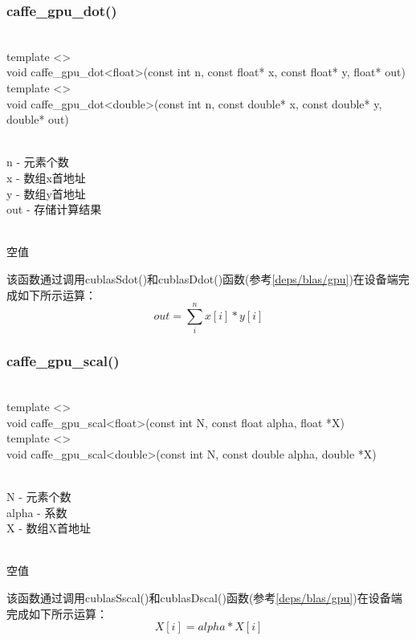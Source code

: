 \subsubsection{caffe\_gpu\_dot()}
\begin{cnfrmfunc}
   \item{}\\
     template <>\\
     void caffe\_gpu\_dot<float>(const int n, const float* x, const float* y, float* out)\\

     template <>\\
     void caffe\_gpu\_dot<double>(const int n, const double* x, const double* y, double* out) 
   \item{}\\
     n - 元素个数\\
     x - 数组x首地址\\
     y - 数组y首地址\\
     out - 存储计算结果
   \item{}\\
     空值
\end{cnfrmfunc}
该函数通过调用cublasSdot()和cublasDdot()函数(参考\ref{deps/blas/gpu})在设备端完成如下所示运算：
$$
out = \sum\limits_{i}^{n}x[i]*y[i]
$$
\subsubsection{caffe\_gpu\_scal()}
\begin{cnfrmfunc}
   \item{}\\
     template <>\\
     void caffe\_gpu\_scal<float>(const int N, const float alpha, float *X)\\

     template <>\\
     void caffe\_gpu\_scal<double>(const int N, const double alpha, double *X)
   \item{}\\
     N - 元素个数\\
     alpha - 系数\\
     X - 数组X首地址\\
   \item{}\\
     空值
\end{cnfrmfunc}
该函数通过调用cublasSscal()和cublasDscal()函数(参考\ref{deps/blas/gpu})在设备端完成如下所示运算：
$$
X[i] = alpha * X[i]
$$


